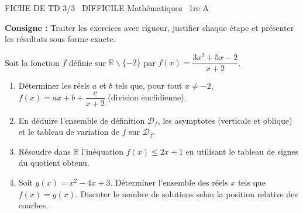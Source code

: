 \documentclass[11pt]{article}
\def\setminus{\mathbin{\backslash}}\let\smallsetminus\setminus
\begin{document}
\begin{tcolorbox}[enhanced,colback=popink,colframe=popink,arc=10pt,boxrule=0pt,left=12pt,right=12pt,top=9pt,bottom=9pt]
{\color{white}\popxbold\small FICHE DE TD 3/3 \textbullet\ DIFFICILE \hfill Mathématiques \textbullet\ 1re A\par}
\end{tcolorbox}
\vspace{4pt}
\noindent \textbf{Consigne :} Traiter les exercices avec rigueur, justifier chaque étape et présenter les résultats sous forme exacte.

\begin{exercice}
Soit la fonction $f$ définie sur $\mathbb{R}\setminus\{-2\}$ par $f(x)=\dfrac{3x^2+5x-2}{x+2}$.
\begin{enumerate}
    \item Déterminer les réels $a$ et $b$ tels que, pour tout $x \neq -2$, $f(x)=ax+b+\dfrac{c}{x+2}$ (division euclidienne).
    \item En déduire l'ensemble de définition $\mathcal{D}_f$, les asymptotes (verticale et oblique) et le tableau de variation de $f$ sur $\mathcal{D}_f$.
    \item Résoudre dans $\mathbb{R}$ l'inéquation $f(x) \leq 2x+1$ en utilisant le tableau de signes du quotient obtenu.
    \item Soit $g(x)=x^2-4x+3$. Déterminer l'ensemble des réels $x$ tels que $f(x)=g(x)$. Discuter le nombre de solutions selon la position relative des courbes.
\end{enumerate}
\end{exercice}
\end{document}
